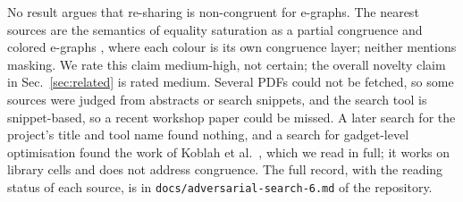 \documentclass[conference]{IEEEtran}
\begin{document}
No result argues that re-sharing is non-congruent for e-graphs. The nearest sources are the semantics of equality saturation as a partial congruence \cite{suciu2025semantic} and colored e-graphs \cite{singher2023colored}, where each colour is its own congruence layer; neither mentions masking. We rate this claim medium-high, not certain; the overall novelty claim in Sec.~\ref{sec:related} is rated medium. Several PDFs could not be fetched, so some sources were judged from abstracts or search snippets, and the search tool is snippet-based, so a recent workshop paper could be missed. A later search for the project's title and tool name found nothing, and a search for gadget-level optimisation found the work of Koblah et al.\ \cite{koblah2025evo}, which we read in full; it works on library cells and does not address congruence. The full record, with the reading status of each source, is in \texttt{docs/adversarial-search-6.md} of the repository.
\end{document}
